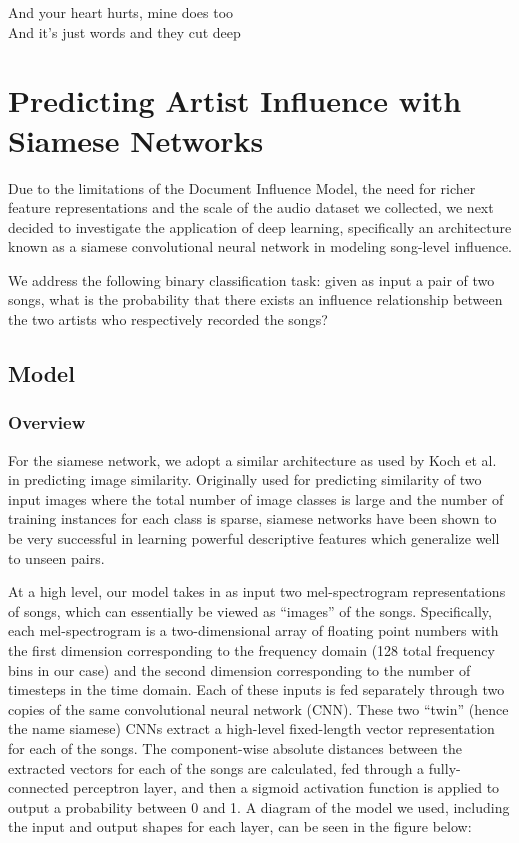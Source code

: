 \begin{savequote}[75mm] 
And your heart hurts, mine does too\\
And it's just words and they cut deep
\end{savequote}

\chapter{Predicting Artist Influence with Siamese Networks}
Due to the limitations of the Document Influence Model, the need for richer feature representations and the scale of the audio dataset we collected, we next decided to investigate the application of deep learning, specifically an architecture known as a siamese convolutional neural network in modeling song-level influence. 

We address the following binary classification task: given as input a pair of two songs, what is the probability that there exists an influence relationship between the two artists who respectively recorded the songs?

\section{Model}
\subsection{Overview}
For the siamese network, we adopt a similar architecture as used by Koch et al. \cite{koch2015siamese} in predicting image similarity. Originally used for predicting similarity of two input images where the total number of image classes is large and the number of training instances for each class is sparse, siamese networks have been shown to be very successful in learning powerful descriptive features which generalize well to unseen pairs.

At a high level, our model takes in as input two mel-spectrogram representations of songs, which can essentially be viewed as ``images'' of the songs. Specifically, each mel-spectrogram is a two-dimensional array of floating point numbers with the first dimension corresponding to the frequency domain (128 total frequency bins in our case) and the second dimension corresponding to the number of timesteps in the time domain. Each of these inputs is fed separately through two copies of the same convolutional neural network (CNN). These two ``twin'' (hence the name siamese) CNNs extract a high-level fixed-length vector representation for each of the songs. The component-wise absolute distances between the extracted vectors for each of the songs are calculated, fed through a fully-connected perceptron layer, and then a sigmoid activation function is applied to output a probability between 0 and 1. A diagram of the model we used, including the input and output shapes for each layer, can be seen in the figure below:

